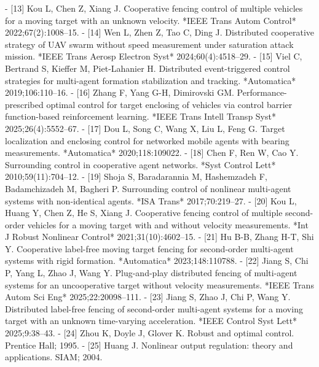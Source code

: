 - [13] Kou L, Chen Z, Xiang J. Cooperative fencing control of multiple vehicles for a moving target with an unknown velocity. *IEEE Trans Autom Control* 2022;67(2):1008–15.
- [14] Wen L, Zhen Z, Tao C, Ding J. Distributed cooperative strategy of UAV swarm without speed measurement under saturation attack mission. *IEEE Trans Aerosp Electron Syst* 2024;60(4):4518–29.
- [15] Viel C, Bertrand S, Kieffer M, Piet-Lahanier H. Distributed event-triggered control strategies for multi-agent formation stabilization and tracking. *Automatica* 2019;106:110–16.
- [16] Zhang F, Yang G-H, Dimirovski GM. Performance-prescribed optimal control for target enclosing of vehicles via control barrier function-based reinforcement learning. *IEEE Trans Intell Transp Syst* 2025;26(4):5552–67.
- [17] Dou L, Song C, Wang X, Liu L, Feng G. Target localization and enclosing control for networked mobile agents with bearing measurements. *Automatica* 2020;118:109022.
- [18] Chen F, Ren W, Cao Y. Surrounding control in cooperative agent networks. *Syst Control Lett* 2010;59(11):704–12.
- [19] Shoja S, Baradarannia M, Hashemzadeh F, Badamchizadeh M, Bagheri P. Surrounding control of nonlinear multi-agent systems with non-identical agents. *ISA Trans* 2017;70:219–27.
- [20] Kou L, Huang Y, Chen Z, He S, Xiang J. Cooperative fencing control of multiple second-order vehicles for a moving target with and without velocity measurements. *Int J Robust Nonlinear Control* 2021;31(10):4602–15.
- [21] Hu B-B, Zhang H-T, Shi Y. Cooperative label-free moving target fencing for second-order multi-agent systems with rigid formation. *Automatica* 2023;148:110788.
- [22] Jiang S, Chi P, Yang L, Zhao J, Wang Y. Plug-and-play distributed fencing of multi-agent systems for an uncooperative target without velocity measurements. *IEEE Trans Autom Sci Eng* 2025;22:20098–111.
- [23] Jiang S, Zhao J, Chi P, Wang Y. Distributed label-free fencing of second-order multi-agent systems for a moving target with an unknown time-varying acceleration. *IEEE Control Syst Lett* 2025;9:38–43.
- [24] Zhou K, Doyle J, Glover K. Robust and optimal control. Prentice Hall; 1995.
- [25] Huang J. Nonlinear output regulation: theory and applications. SIAM; 2004.